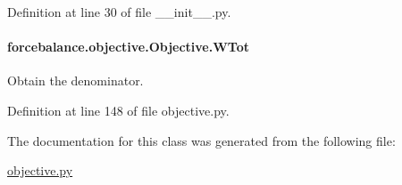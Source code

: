 Definition at line 30 of file \-\_\-\-\_\-init\-\_\-\-\_\-.\-py.

\hypertarget{classforcebalance_1_1objective_1_1Objective_a1ea300bb1db142dfdf43621454e8c589}{
\paragraph[{W\-Tot}]{\setlength{\rightskip}{0pt plus 5cm}forcebalance.\-objective.\-Objective.\-W\-Tot}}\label{classforcebalance_1_1objective_1_1Objective_a1ea300bb1db142dfdf43621454e8c589}


Obtain the denominator. 



Definition at line 148 of file objective.\-py.



The documentation for this class was generated from the following file\-:\begin{DoxyCompactItemize}
\item 
\hyperlink{objective_8py}{objective.\-py}\end{DoxyCompactItemize}

